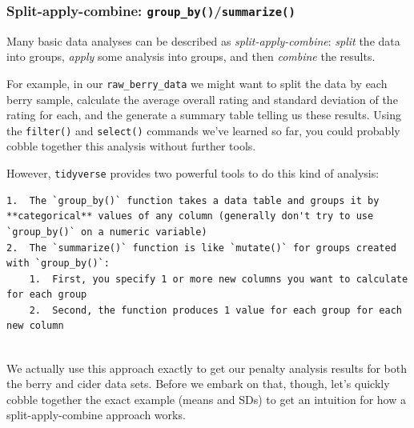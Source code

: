 \documentclass[
]{book}
\begin{document}
\hypertarget{split-apply-combine-group_bysummarize}{%
\subsubsection{\texorpdfstring{Split-apply-combine: \texttt{group\_by()}/\texttt{summarize()}}{Split-apply-combine: group\_by()/summarize()}}\label{split-apply-combine-group_bysummarize}}

Many basic data analyses can be described as \emph{split-apply-combine}: \emph{split} the data into groups, \emph{apply} some analysis into groups, and then \emph{combine} the results.

For example, in our \texttt{raw\_berry\_data} we might want to split the data by each berry sample, calculate the average overall rating and standard deviation of the rating for each, and the generate a summary table telling us these results. Using the \texttt{filter()} and \texttt{select()} commands we've learned so far, you could probably cobble together this analysis without further tools.

However, \texttt{tidyverse} provides two powerful tools to do this kind of analysis:

\begin{verbatim}
1.  The `group_by()` function takes a data table and groups it by **categorical** values of any column (generally don't try to use `group_by()` on a numeric variable)
2.  The `summarize()` function is like `mutate()` for groups created with `group_by()`: 
    1.  First, you specify 1 or more new columns you want to calculate for each group
    2.  Second, the function produces 1 value for each group for each new column
    
\end{verbatim}

We actually use this approach exactly to get our penalty analysis results for both the berry and cider data sets. Before we embark on that, though, let's quickly cobble together the exact example (means and SDs) to get an intuition for how a split-apply-combine approach works.
\end{document}
